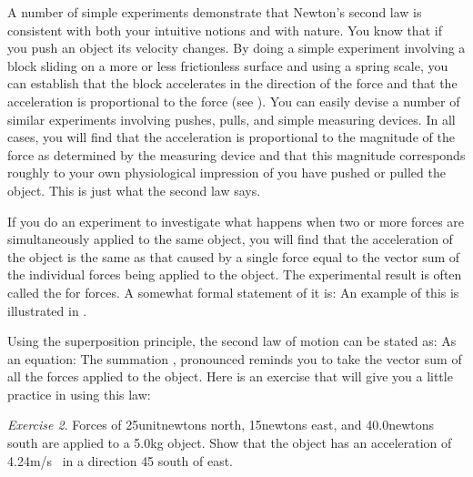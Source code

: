 {
A number of simple experiments demonstrate that Newton's second law is
consistent with both your intuitive notions and with nature.
You know that if you push an object its velocity changes.
By doing a simple experiment involving a block sliding on a more or less
frictionless surface and using a spring scale, you can establish that the
block accelerates in the direction of the force and that the acceleration is
proportional to the force (see ).
You can easily devise a number of similar experiments involving pushes,
pulls, and simple measuring devices.
In all cases, you will find that the acceleration is proportional to the
magnitude of the force as determined by the measuring device and that this
magnitude corresponds roughly to your own physiological impression of
 you have pushed or pulled the object.
This is just what the second law says.


If you do an experiment to investigate what happens when two or more forces
are simultaneously applied to the same object, you will find that the
acceleration of the object is the same as that caused by a single force
equal to the vector sum of the individual forces being applied to the object.
The experimental result is often called the  for
forces.
A somewhat formal statement of it is:
%
%
An example of this is illustrated in .

Using the superposition principle, the second law of
motion can be stated
as:
%
%
As an equation:
%
%
The summation \m{\sum}, pronounced
 reminds you to take the vector
sum of all the forces applied to the object.
Here is an exercise that will give you a little practice in using this law:

\enlargethispage{1pc}
\tryit \textit{Exercise 2}. Forces of 25unit{newtons} north, 15\unit{newtons} east, and
40.0\unit{newtons} south are applied to a 5.0\unit{kg} object.
Show that the object has an acceleration of 4.24\unit{m/s} in a direction {45\degrees}
south of east. \,
%

}%
